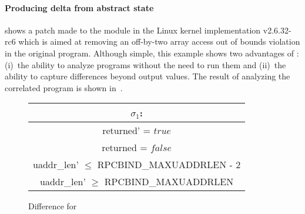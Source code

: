 %


\paragraph{Producing delta from abstract state}



 shows a patch made to the  module in the Linux kernel  implementation v2.6.32-rc6 which is aimed at removing an off-by-two array access out of bounds violation in the original program. Although simple, this example shows two advantages of {\tool}: (i)~the ability to analyze programs without the need to run them and (ii)~the ability to capture differences beyond output values. The result of analyzing the correlated program is shown in~.

\begin{figure}
\scriptsize
\centering
\begin{tabular}{c}
$\sigma_1$:
\\ \hline
returned' = $true$
\\
returned = $false$
\\
uaddr\_len' $\leq$ RPCBIND\_MAXUADDRLEN - 2
\\
uaddr\_len' $\geq$ RPCBIND\_MAXUADDRLEN
\\ \hline
\end{tabular}
\caption{Difference for }\label{Fi:sunrpc}

\end{figure}

